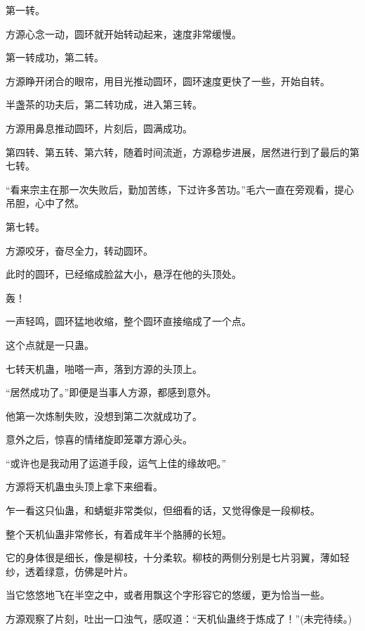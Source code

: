 \begin{this_body}
第一转。

方源心念一动，圆环就开始转动起来，速度非常缓慢。

第一转成功，第二转。

方源睁开闭合的眼帘，用目光推动圆环，圆环速度更快了一些，开始自转。

半盏茶的功夫后，第二转功成，进入第三转。

方源用鼻息推动圆环，片刻后，圆满成功。

第四转、第五转、第六转，随着时间流逝，方源稳步进展，居然进行到了最后的第七转。

“看来宗主在那一次失败后，勤加苦练，下过许多苦功。”毛六一直在旁观看，提心吊胆，心中了然。

第七转。

方源咬牙，奋尽全力，转动圆环。

此时的圆环，已经缩成脸盆大小，悬浮在他的头顶处。

轰！

一声轻鸣，圆环猛地收缩，整个圆环直接缩成了一个点。

这个点就是一只蛊。

七转天机蛊，啪嗒一声，落到方源的头顶上。

“居然成功了。”即便是当事人方源，都感到意外。

他第一次炼制失败，没想到第二次就成功了。

意外之后，惊喜的情绪旋即笼罩方源心头。

“或许也是我动用了运道手段，运气上佳的缘故吧。”

方源将天机蛊虫头顶上拿下来细看。

乍一看这只仙蛊，和蜻蜓非常类似，但细看的话，又觉得像是一段柳枝。

整个天机仙蛊非常修长，有着成年半个胳膊的长短。

它的身体很是细长，像是柳枝，十分柔软。柳枝的两侧分别是七片羽翼，薄如轻纱，透着绿意，仿佛是叶片。

当它悠悠地飞在半空之中，或者用飘这个字形容它的悠缓，更为恰当一些。

方源观察了片刻，吐出一口浊气，感叹道：“天机仙蛊终于炼成了！”(未完待续。)

\end{this_body}

